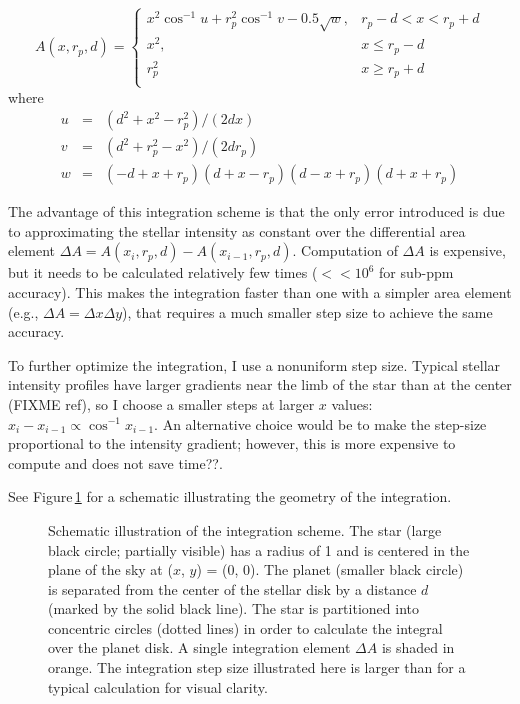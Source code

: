 \documentclass[12pt,preprint]{aastex}
\begin{document}
\begin{equation}
A(x, r_p, d) = 
\begin{cases}
x^2\cos^{-1}{u} + r_p^2\cos^{-1}{v} - 0.5\sqrt{w}, & r_p -d < x < r_p + d\\
x^2, & x \le r_p - d\\
r_p^2 & x \ge r_p +d \\
\end{cases}
\end{equation}
where
\begin{eqnarray}
u &=& (d^2+x^2-r_p^2)/(2dx)\\
v &=& (d^2 + r_p^2 -x^2)/(2dr_p) \\
w &=& (-d+x+r_p)(d+x-r_p)(d-x+r_p)(d+x+r_p)
\end{eqnarray}

The advantage of this integration scheme is that the only error introduced is due to approximating the stellar intensity as constant over the differential area element $\Delta A = A(x_i, r_p, d) - A(x_{i-1}, r_p, d)$.  Computation of $\Delta A$ is expensive, but it needs to be calculated relatively few times ($<<10^{6}$ for sub-ppm accuracy). This makes the integration faster than one with a simpler area element (e.g., $\Delta A = \Delta x \Delta y$), that requires a much smaller step size to achieve the same accuracy.

To further optimize the integration, I use a nonuniform step size.  Typical stellar intensity profiles have larger gradients near the limb of the star than at the center (FIXME ref), so I choose a smaller steps at larger $x$ values: $x_i - x_{i-1} \propto \cos^{-1}{x_{i-1}}$.  An alternative choice would be to make the step-size proportional to the intensity gradient; however, this is more expensive to compute and does not save time??.

See Figure\,\ref{fig:integration} for a schematic illustrating the geometry of the integration. 

\begin{figure}
\caption{Schematic illustration of the integration scheme. The star (large black circle; partially visible) has a radius of 1 and is centered in the plane of the sky at ($x$, $y$) = (0, 0). The planet (smaller black circle) is separated from the center of the stellar disk by a distance $d$ (marked by the solid black line).  The star is partitioned into concentric circles (dotted lines) in order to calculate the integral over the planet disk.  A single integration element $\Delta A$ is shaded in orange. The integration step size illustrated here is larger than for a typical calculation for visual clarity.}
\label{fig:integration}
\end{figure}
\end{document}
